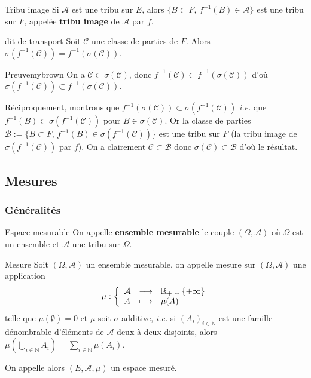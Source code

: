     \begin{defi}{Tribu image}{}
        Si $\mathcal{A}$ est une tribu sur $E$, alors $\{ B \subset F, \, f^{-1}(B) \in \mathcal{A} \}$ est une tribu sur $F$, appelée \textbf{tribu image} de $\mathcal{A}$ par $f$.
    \end{defi}

    \begin{lem}{dit de transport}{}
        Soit $\mathcal{C}$ une classe de parties de $F$. Alors $\sigma(f^{-1}(\mathcal{C})) = f^{-1}(\sigma(\mathcal{C}))$.
    \end{lem}

    \begin{demo}{Preuve}{mybrown}
        On a $\mathcal{C} \subset \sigma(\mathcal{C})$, donc $f^{-1}(\mathcal{C}) \subset f^{-1}(\sigma(\mathcal{C}))$ d’où $\sigma(f^{-1}(\mathcal{C})) \subset f^{-1}(\sigma(\mathcal{C}))$.

        Réciproquement, montrons que $f^{-1}(\sigma(\mathcal{C})) \subset \sigma(f^{-1}(\mathcal{C}))$ \textit{i.e.} que $f^{-1}(B) \subset \sigma(f^{-1}(\mathcal{C}))$ pour $B \in \sigma(\mathcal{C})$. Or la classe de parties $\mathcal{B} := \{ B \subset F, \, f^{-1}(B) \in \sigma(f^{-1}(\mathcal{C}))\}$ est une tribu sur $F$ (la tribu image de $\sigma(f^{-1}(\mathcal{C}))$ par $f$). On a clairement $\mathcal{C} \subset \mathcal{B}$ donc $\sigma(\mathcal{C}) \subset \mathcal{B}$ d’où le résultat.
    \end{demo}

    \subsection{Mesures}

    \subsubsection{Généralités}

    \begin{defi}{Espace mesurable}{}
        On appelle \textbf{ensemble mesurable} le couple $(\Omega, \mathcal{A})$ où $\Omega$ est un ensemble et $\mathcal{A}$ une tribu sur $\Omega$.
    \end{defi}

    \begin{defi}{Mesure}{}
        Soit $(\Omega, \mathcal{A})$ un ensemble mesurable, on appelle mesure sur $(\Omega, \mathcal{A})$ une application 
        \[ \fonction{\mu}{\mathcal{A}}{\mathbb{R}_+ \cup \left\{+\infty\right\}}{A}{\mu(A)} \]    
        telle que $\mu(\emptyset) = 0$ et $\mu$ soit $\sigma$-additive, \textit{i.e.} si $(A_i)_{i \in \mathbb{N}}$ est une famille dénombrable d’éléments de $\mathcal{A}$ deux à deux disjoints, alors $\mu\left(\bigcup_{i \in \mathbb{N}} A_i\right) = \sum_{i \in \mathbb{N}} \mu(A_i)$.

        On appelle alors $(E,\mathcal{A}, \mu)$ un espace mesuré.
    \end{defi}

